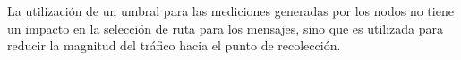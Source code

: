 La utilización de un umbral para las mediciones generadas por los nodos no tiene un impacto en la selección de ruta para los mensajes, sino que es utilizada para reducir la magnitud del tráfico hacia el punto de recolección.






